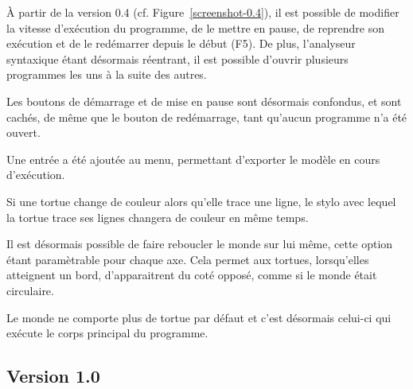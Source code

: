 À partir de la version 0.4 (cf. Figure~\ref{screenshot-0.4}), il est possible de modifier la vitesse d'exécution du programme, de le mettre en pause, de reprendre son exécution et de le redémarrer depuis le début (F5). De plus, l'analyseur syntaxique étant désormais réentrant, il est possible d'ouvrir plusieurs programmes les uns à la suite des autres.

Les boutons de démarrage et de mise en pause sont désormais confondus, et sont cachés, de même que le bouton de redémarrage, tant qu'aucun programme n'a été ouvert.

Une entrée a été ajoutée au menu, permettant d'exporter le modèle en cours d'exécution.

Si une tortue change de couleur alors qu'elle trace une ligne, le stylo avec lequel la tortue trace ses lignes changera de couleur en même temps.

Il est désormais possible de faire reboucler le monde sur lui même, cette option étant paramètrable pour chaque axe. Cela permet aux tortues, lorsqu'elles atteignent un bord, d'apparaitrent du coté opposé, comme si le monde était circulaire.

Le monde ne comporte plus de tortue par défaut et c'est désormais celui-ci qui exécute le corps principal du programme.

\subsection{Version 1.0}


